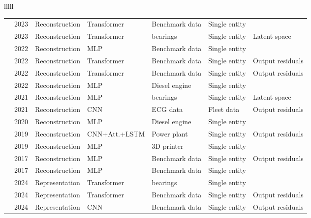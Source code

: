 \begin{landscape}
\begin{longtable}{lllll}
\begin{tabular}{lllllll}
\cite{yangDDMTDenoisingDiffusion2023} & 2023 & Reconstruction & Transformer & Benchmark data & Single entity & \texttimes \\
\cite{yangSelfSupervisedLearningSignal2023} & 2023 & Reconstruction & Transformer & bearings & Single entity & Latent space \\
\cite{gargEvaluationAnomalyDetection2022} & 2022 & Reconstruction & MLP & Benchmark data & Single entity & \texttimes \\
\cite{tuliTranADDeepTransformer2022} & 2022 & Reconstruction & Transformer & Benchmark data & Single entity & Output residuals \\
\cite{xuAnomalyTransformerTime2022} & 2022 & Reconstruction & Transformer & Benchmark data & Single entity & Output residuals \\
\cite{yuFastAdaptionMulti2022} & 2022 & Reconstruction & MLP & Diesel engine & Single entity & \texttimes \\
\cite{arellano-espitiaDeepCompactClusteringBasedAnomaly2021} & 2021 & Reconstruction & MLP & bearings & Single entity & Latent space \\
\cite{thillTemporalConvolutionalAutoencoder2021} & 2021 & Reconstruction & CNN & ECG data & Fleet data & Output residuals \\
\cite{ellefsenOnlineFaultDetection2020} & 2020 & Reconstruction & MLP & Diesel engine & Single entity & \texttimes \\
\cite{zhangDeepNeuralNetwork2019} & 2019 & Reconstruction & CNN+Att.+LSTM & Power plant & Single entity & Output residuals \\
\cite{zhangDynamicConditionMonitoring2019} & 2019 & Reconstruction & MLP & 3D printer & Single entity & \texttimes \\
\cite{shipmonTimeSeriesAnomaly2017} & 2017 & Reconstruction & MLP & Benchmark data & Single entity & Output residuals \\
\cite{zhouAnomalyDetectionRobust2017} & 2017 & Reconstruction & MLP & Benchmark data & Single entity & \texttimes \\
\cite{kangFaultAnomalyDetection2024} & 2024 & Representation & Transformer & bearings & Single entity & \texttimes \\
\cite{leeExplainableTimeSeries2024} & 2024 & Representation & Transformer & Benchmark data & Single entity & Output residuals \\
\cite{milkovicFRAnomalyFlowbasedRapid2024} & 2024 & Representation & CNN & Benchmark data & Single entity & Output residuals \\

\end{tabular}
\end{longtable}
\end{landscape}
